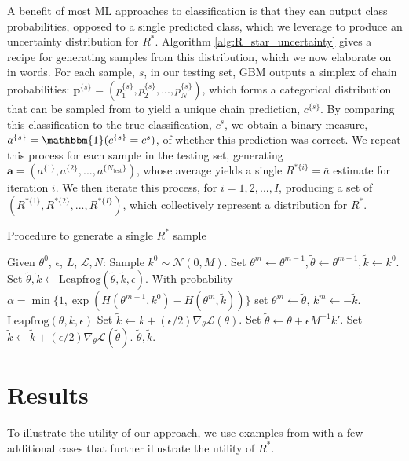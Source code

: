 \documentclass{article}
\newcommand{\N}{\mathcal{N}}
\newcommand{\cL}{\mathcal{L}}
\newcommand{\LF}{\mathrm{Leapfrog}}
\begin{document}
A benefit of most ML approaches to classification is that they can output class probabilities, opposed to a single predicted class, which we leverage to produce an uncertainty distribution for $R^*$. Algorithm \ref{alg:R_star_uncertainty} gives a recipe for generating samples from this distribution, which we now elaborate on in words. For each sample, $s$, in our testing set, GBM outputs a simplex of chain probabilities: $\boldsymbol{p}^{\{s\}}=(p_1^{\{s\}},p_2^{\{s\}},...,p_N^{\{s\}})$, which forms a categorical distribution that can be sampled from to yield a unique chain prediction, $c^{\{s\}}$. By comparing this classification to the true classification, $c^s$, we obtain a binary measure, $a^{\{s\}}=\mathbbm{1}(c^{\{s\}}=c^s)$, of whether this prediction was correct. We repeat this process for each sample in the testing set, generating $\boldsymbol{a}=(a^{\{1\}},a^{\{2\}},...,a^{\{N_\text{test}\}})$, whose average yields a single $R^{*\{i\}}=\bar{a}$ estimate for iteration $i$. We then iterate this process, for $i=1,2,...,I$, producing a set of $(R^{*\{1\}},R^{*\{2\}},...,R^{*\{I\}})$, which collectively represent a distribution for $R^*$. 


\begin{algorithm}[tb]
	\caption{Procedure to generate a single $R^*$ sample}
	\label{alg:R_star_uncertainty}
	\begin{algorithmic}
		\STATE Given $\theta^0$, $\epsilon$, $L$, $\cL, N$:
		\STATE Sample $k^0\sim\N(0, M)$.
		\STATE Set $\theta^m\leftarrow \theta^{m-1}, \tilde\theta\leftarrow \theta^{m-1}, \tilde k\leftarrow k^0$.
		\STATE Set $\tilde\theta, \tilde k \leftarrow \LF(\tilde\theta, \tilde k, \epsilon)$.
		\ENDFOR
		\STATE With probability $\alpha = \min\{1, \exp(H(\theta^{m-1}, k^0)-H(\theta^m,\tilde k))\}$
		set $\theta^m\leftarrow\tilde \theta$, $k^m\leftarrow -\tilde k$.
		\ENDFOR
		\STATE
		 $\LF(\theta, k, \epsilon)$
		\STATE Set $\tilde k \leftarrow k +
		(\epsilon/2)\nabla_\theta\cL(\theta)$.
		\STATE Set $\tilde \theta \leftarrow \theta +
		\epsilon M^{-1}k'$.
		\STATE Set $\tilde k \leftarrow \tilde k +
		(\epsilon/2)\nabla_\theta\cL(\tilde\theta)$.
		\RETURN $\tilde \theta, \tilde k$.
	\end{algorithmic}
\end{algorithm}

\section{Results}\label{sec:results}
To illustrate the utility of our approach, we use examples from \cite{vehtari2019rank} with a few additional cases that further illustrate the utility of $R^*$.
\end{document}

